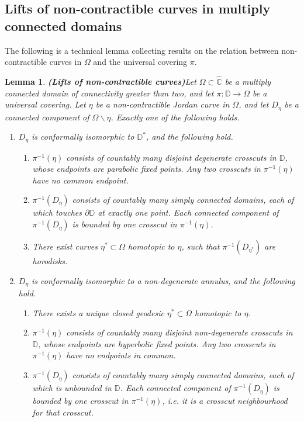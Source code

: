 \documentclass[11pt,a4paper,reqno]{amsart}
\theoremstyle{plain}
\newtheorem{lemma}[thm]{Lemma}
\theoremstyle{definition}
\theoremstyle{plain}
\def\DD{\mathbb{D}}
\begin{document}
\subsection*{Lifts of non-contractible curves in multiply connected domains}
The following is a technical lemma collecting results on the relation between non-contractible curves in $ \Omega $ and the universal covering $ \pi $.
\begin{lemma}{\bf (Lifts of non-contractible curves)}\label{lemma-lifts-of-curves}
	Let $ \Omega \subset \widehat{\mathbb{C}}$ be a multiply connected domain of connectivity greater than two, and let $ \pi\colon\mathbb{D}\to \Omega $ be a universal covering. Let $ \eta $ be a non-contractible Jordan curve in $ \Omega $, and let $ D_\eta $ be a connected component of $ \Omega\smallsetminus\eta $. Exactly one of the following holds. \begin{enumerate}[label={\em (\alph*)}] 
			\item  $D_\eta $ is conformally isomorphic to $ \mathbb{D}^* $, and the following hold.
		\begin{enumerate}[label={\em a.\arabic*}]
			\item $ \pi^{-1}(\eta) $ consists of  countably many disjoint degenerate crosscuts in $ \mathbb{D} $, whose endpoints are parabolic fixed points. Any two crosscuts in $ \pi^{-1}(\eta) $ have no  common endpoint.
			\item $ \pi^{-1}(D_\eta) $ consists of countably many simply connected domains, each of which touches $\partial\DD$ at exactly one point. Each connected component of $ \pi^{-1}(D_\eta) $ is bounded by one crosscut in $ \pi^{-1}(\eta) $.
			\item There exist curves $\eta^*\subset\Omega$ homotopic to $\eta$, such that $ \pi^{-1}(D_{\eta^*}) $ are horodisks.
		\end{enumerate}
		\item  $ D_\eta $ is conformally isomorphic to a non-degenerate annulus, and the following hold.
		\begin{enumerate}[label={\em b.\arabic*}]
			\item There exists a unique closed geodesic $\eta^*\subset\Omega$ homotopic to $\eta$.
				\item $ \pi^{-1}(\eta) $ consists of  countably many disjoint non-degenerate crosscuts in $ \mathbb{D} $, whose endpoints are hyperbolic fixed points. Any two crosscuts in $ \pi^{-1}(\eta) $ have no endpoints in common.
			\item $ \pi^{-1}(D_\eta) $ consists of countably many simply connected domains, each of which is unbounded in $ \mathbb{D} $. Each connected component of $ \pi^{-1}(D_\eta) $ is bounded by one crosscut in $ \pi^{-1}(\eta) $, i.e. it is a crosscut neighbourhood for that crosscut.

\end{enumerate}
\end{enumerate}
\end{lemma}
\end{document}
